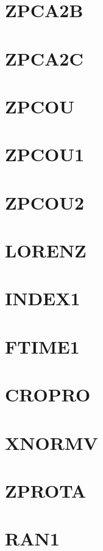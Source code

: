 \documentclass[10pt,UTF8]{ctexbook}
\begin{document}
\section{ZPCA2B}
\section{ZPCA2C}
\section{ZPCOU}
\section{ZPCOU1}
\section{ZPCOU2}
\section{LORENZ}
\section{INDEX1}
\section{FTIME1}
\section{CROPRO}
\section{XNORMV}
\section{ZPROTA}
\section{RAN1}
\end{document}
